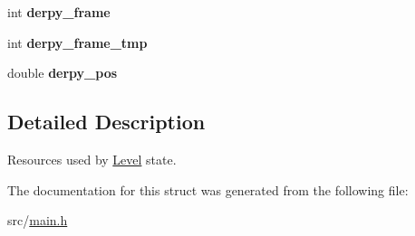 \begin{DoxyCompactItemize}
\item 
\hypertarget{structLevel_aab3e7d9746c741ce8e1a76df13be7c53}{int {\bfseries derpy\-\_\-frame}}\label{structLevel_aab3e7d9746c741ce8e1a76df13be7c53}

\item 
\hypertarget{structLevel_aa6a30e7b31e2300936f8e97890e1817c}{int {\bfseries derpy\-\_\-frame\-\_\-tmp}}\label{structLevel_aa6a30e7b31e2300936f8e97890e1817c}

\item 
\hypertarget{structLevel_a2bc3affc5c71ac8f6b9b775cefac0444}{double {\bfseries derpy\-\_\-pos}}\label{structLevel_a2bc3affc5c71ac8f6b9b775cefac0444}

\end{DoxyCompactItemize}


\subsection{\-Detailed \-Description}
\-Resources used by \hyperlink{structLevel}{\-Level} state. 

\-The documentation for this struct was generated from the following file\-:\begin{DoxyCompactItemize}
\item 
src/\hyperlink{main_8h}{main.\-h}\end{DoxyCompactItemize}
